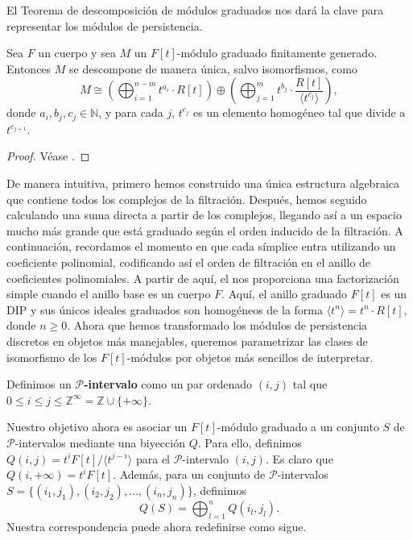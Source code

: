El Teorema de descomposición de módulos graduados nos dará la clave para representar los módulos de persistencia.

\begin{teorema}
	\label{teo:desc-mod-grad}
	Sea $F$ un cuerpo y sea \( M \) un \( F[t] \)-módulo graduado finitamente generado. Entonces \( M \) se descompone de manera única, salvo isomorfismos, como
	\[
	M \cong \left( \bigoplus_{i=1}^{n-m} t^{a_i} \cdot R[t] \right) \oplus \left( \bigoplus_{j=1}^{m} t^{b_j} \cdot \frac{R[t]}{\langle t^{c_j} \rangle} \right),
	\]
	donde \( a_i, b_j, c_j \in \mathbb{N} \), y para cada \( j \), \( t^{c_j} \) es un elemento homogéneo tal que divide a \( t^{c_{j+1}} \).
\end{teorema}
\begin{proof}
	Véase \cite{webb1985decomposition}.
\end{proof}

De manera intuitiva, primero hemos construido una única estructura algebraica que contiene todos los complejos de la filtración. Después, hemos seguido calculando una suma directa a partir de los complejos, llegando así a un espacio mucho más grande que está graduado según el orden inducido de la filtración. A continuación, recordamos el momento en que cada símplice entra utilizando un coeficiente polinomial, codificando así el orden de filtración en el anillo de coeficientes polinomiales. A partir de aquí, el  nos proporciona una factorización simple cuando el anillo base es un cuerpo \( F \). Aquí, el anillo graduado \( F[t] \) es un DIP y sus únicos ideales graduados son homogéneos de la forma \( \langle t^n \rangle = t^n \cdot R[t] \), donde \( n \geq 0 \). Ahora que hemos transformado los módulos de persistencia discretos en objetos más manejables, queremos parametrizar las clases de isomorfismo de los \( F[t] \)-módulos por objetos más sencillos de interpretar.

\begin{definicion}
	Definimos un \textbf{$\mathcal{P}$-intervalo} como un par ordenado \( (i, j) \) tal que \( 0 \leq i \leq j \leq \mathbb{Z}^{\infty} = \mathbb{Z} \cup \{+\infty\} \).
\end{definicion}

Nuestro objetivo ahora es asociar un \( F[t] \)-módulo graduado a un conjunto \( S \) de $\mathcal{P}$-intervalos mediante una biyección \( Q \). Para ello, definimos \( Q(i, j) = t^i F[t]/\langle t^{j-i}\rangle \) para el $\mathcal{P}$-intervalo \( (i, j) \). Es claro que \( Q(i, +\infty) = t^i F[t] \). Además, para un conjunto de $\mathcal{P}$-intervalos \( S = \{(i_1, j_1), (i_2, j_2), \ldots, (i_n, j_n)\} \), definimos
\[
Q(S) = \bigoplus_{l=1}^n Q(i_l, j_l).
\]
Nuestra correspondencia puede ahora redefinirse como sigue.

